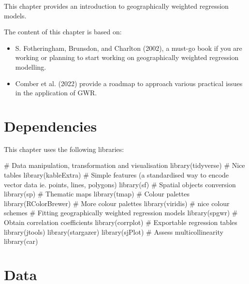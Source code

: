 \documentclass[
  letterpaper,
  krantz2]{style/krantz}
\newenvironment{Shaded}{\begin{snugshade}}{\end{snugshade}}
\newcommand{\CommentTok}[1]{\textcolor[rgb]{0.37,0.37,0.37}{#1}}
\newcommand{\FunctionTok}[1]{\textcolor[rgb]{0.28,0.35,0.67}{#1}}
\newcommand{\NormalTok}[1]{\textcolor[rgb]{0.00,0.23,0.31}{#1}}
\begin{document}
This chapter provides an introduction to geographically weighted
regression models.

The content of this chapter is based on:

\begin{itemize}
\item
  S. Fotheringham, Brunsdon, and Charlton (2002), a must-go book if you
  are working or planning to start working on geographically weighted
  regression modelling.
\item
  Comber et al. (2022) provide a roadmap to approach various practical
  issues in the application of GWR.
\end{itemize}

\hypertarget{dependencies-7}{%
\section{Dependencies}\label{dependencies-7}}

This chapter uses the following libraries:

\begin{Shaded}
\begin{Highlighting}[]
\CommentTok{\# Data manipulation, transformation and visualisation}
\FunctionTok{library}\NormalTok{(tidyverse)}
\CommentTok{\# Nice tables}
\FunctionTok{library}\NormalTok{(kableExtra)}
\CommentTok{\# Simple features (a standardised way to encode vector data ie. points, lines, polygons)}
\FunctionTok{library}\NormalTok{(sf) }
\CommentTok{\# Spatial objects conversion}
\FunctionTok{library}\NormalTok{(sp) }
\CommentTok{\# Thematic maps}
\FunctionTok{library}\NormalTok{(tmap) }
\CommentTok{\# Colour palettes}
\FunctionTok{library}\NormalTok{(RColorBrewer) }
\CommentTok{\# More colour palettes}
\FunctionTok{library}\NormalTok{(viridis) }\CommentTok{\# nice colour schemes}
\CommentTok{\# Fitting geographically weighted regression models}
\FunctionTok{library}\NormalTok{(spgwr)}
\CommentTok{\# Obtain correlation coefficients}
\FunctionTok{library}\NormalTok{(corrplot)}
\CommentTok{\# Exportable regression tables}
\FunctionTok{library}\NormalTok{(jtools)}
\FunctionTok{library}\NormalTok{(stargazer)}
\FunctionTok{library}\NormalTok{(sjPlot)}
\CommentTok{\# Assess multicollinearity}
\FunctionTok{library}\NormalTok{(car)}
\end{Highlighting}
\end{Shaded}

\hypertarget{data-6}{%
\section{Data}\label{data-6}}
\end{document}
